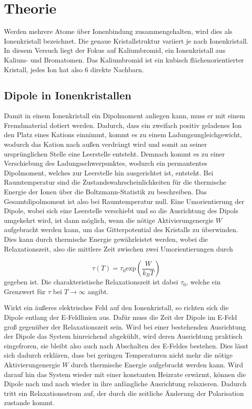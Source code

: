 \section{Theorie}
\label{sec:Theorie}

Werden mehrere Atome über Ionenbindung zusammengehalten, wird dies als Ionenkristall bezeichnet. Die genaue Kristallstruktur variiert je nach Ionenkristall.
In diesem Versuch liegt der Fokus auf Kaliumbromid, ein Ionenkristall aus Kalium- und Bromatomen. Das Kaliumbromid ist ein kubisch flächenorientierter Kristall,
jedes Ion hat also 6 direkte Nachbarn. 

\subsection{Dipole in Ionenkristallen}

Damit in einem Ionenkristall ein Dipolmoment anliegen kann, muss er mit einem Fremdmaterial dotiert werden. Dadurch, dass ein zweifach positiv geladenes Ion den Platz eines 
Kations einnimmt, kommt es zu einem Ladungsungleichgewicht, wodurch das Kation nach außen verdrängt wird und somit an seiner ursprünglichen Stelle eine Leerstelle entsteht.
Demnach kommt es zu einer Verschiebung des Ladungsschwerpunktes, wodurch ein permantentes Dipolmoment, welches zur Leerstelle hin ausgerichtet ist, entsteht. 
Bei Raumtemperatur sind die Zustandswahrscheinlichkeiten für die thermische Energie der Ionen über die Boltzmann-Statistik zu beschreiben. Das Gesamtdipolmoment ist also bei Raumtemperatur null. 
Eine Umorientierung der Dipole, wobei sich eine Leerstelle verschiebt und so die Ausrichtung des Dipols umgekehrt wird, ist dann möglich, wenn die nötige Aktivierungenergie $W$ aufgebracht werden kann, um das Gitterpotential des Kristalls zu überwinden. 
Dies kann durch thermische Energie gewährleistet werden, wobei die Relaxationszeit, also die mittlere Zeit zwischen zwei Umorientierungen durch 

\begin{equation}
    \tau(T) = \tau_0 \text{exp} \left( \frac{W}{k_B T}\right)
\end{equation}
gegeben ist. Die charakteristische Relaxationszeit ist dabei $\tau_0 $, welche ein Grenzwert für $\tau$ bei $T \to \infty$ angibt.

Wirkt ein äußeres elektrisches Feld auf den Ionenkristall, so richten sich die Dipole entlang der E-Feldlinien aus. Dafür muss die Zeit der Dipole im E-Feld 
groß gegenüber der Relaxationszeit sein. Wird bei einer bestehenden Ausrichtung der Dipole das System hinreichend abgekühlt, wird deren Ausrichtung praktisch eingefroren, sie bleibt 
also auch nach Abschalten des E-Feldes bestehen. Dies lässt sich dadurch erklären, dass bei geringen Temperaturen nicht mehr die nötige Aktivierungenergie $W$ durch thermische Energie 
aufgebracht werden kann. Wird darauf hin das System wieder mit einer konstanten Heizrate erwärmt, können die Dipole nach und nach wieder in ihre anfängliche Ausrichtung relaxieren. 
Dadurch tritt ein Relaxationsstrom auf, der durch die zeitliche Änderung der Polarisation zustande kommt.

